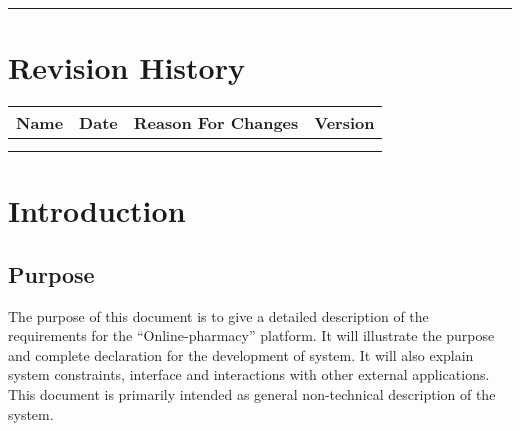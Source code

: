 \documentclass{scrreprt}
\date{}
\def\myversion{1.0 }
\begin{document}
\begin{flushright}
    \rule{16cm}{5pt}\vskip1cm
\end{flushright}

\tableofcontents


\chapter*{Revision History}

\begin{center}
    \begin{tabular}{|c|c|c|c|}
        \hline
	    Name & Date & Reason For Changes & Version\\
        \hline
	     &  &  & \\
        \hline
	     &  &  & \\
        \hline
    \end{tabular}
\end{center}

\chapter{Introduction}

\section{Purpose}
The purpose of this document is to give a detailed description of the requirements for the “Online-pharmacy” platform. It will illustrate the purpose and complete declaration for the development of system. It will also explain system constraints, interface and interactions with other external applications. This document is primarily intended as general non-technical description of the system. 
\end{document}
